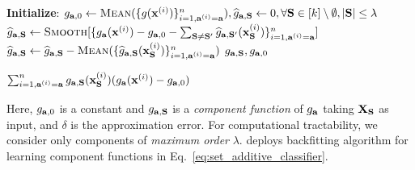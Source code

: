 \begin{algorithm}
\begin{algorithmic}[1]
		\label{algo_line:local_regression_start}
		\State \textbf{Initialize}: $ g_{\mathbf{a}, 0} \leftarrow \textsc{Mean}(\{g(\mathbf{x}^{(i)})\}_{i=1, \mathbf{a}^{(i)} = \mathbf{a}}^n), \widehat{g}_{\mathbf{a}, \mathbf{S}} \leftarrow 0, \forall \mathbf{S} \in [k]\setminus\emptyset, |\mathbf{S}|\le \lambda$ \label{alg_line:initialization}
		\State $ \widehat{g}_{\mathbf{a}, \mathbf{S}} \leftarrow \textsc{Smooth}[\{g_{\mathbf{a}}(\mathbf{x}^{(i)}) - g_{\mathbf{a}, 0} - \sum_{\mathbf{S} \ne \mathbf{S}'} \widehat{g}_{\mathbf{a}, \mathbf{S}'}(\mathbf{x}_{\mathbf{S}}^{(i)})\}_{i=1, \mathbf{a}^{(i)} = \mathbf{a}}^n] 
		$\label{alg_line:backfitting_step} 
		\State $\widehat{g}_{\mathbf{a}, \mathbf{S}}  \leftarrow \widehat{g}_{\mathbf{a}, \mathbf{S}} - \textsc{Mean}(\{\widehat{g}_{\mathbf{a}, \mathbf{S}}(\mathbf{x}_{\mathbf{S}}^{(i)})\}_{i=1, \mathbf{a}^{(i)} = \mathbf{a}}^n)$ \label{alg_line:mean_centered} 
		\EndFor
		\EndWhile
		\State \Return $ g_{\mathbf{a}, \mathbf{S}},g_{\mathbf{a}, 0} $
		\label{algo_line:local_regression_end} 
		\EndFunction
		
		
		\label{algo_line:covariance_computation_start}
		\State \Return $ \sum_{i=1, \mathbf{a}^{(i)} = \mathbf{a}}^n g_{\mathbf{a}, \mathbf{S}}(\mathbf{x}_{\mathbf{S}}^{(i)})(g_\mathbf{a}(\mathbf{x}^{(i)}) - g_{\mathbf{a}, 0}) $
		\label{algo_line:covariance_computation_end}
		\EndFunction
	\end{algorithmic}
\end{algorithm}
Here, $ g_{\mathbf{a}, 0} $ is a constant and $ g_{\mathbf{a},\mathbf{S}} $ is a \emph{component function} of $ g_{\mathbf{a}} $ taking  $ \mathbf{X}_{\mathbf{S}} $ as input, and $ \delta $ is the approximation error. For computational tractability, we consider only components of \emph{maximum order} $ \lambda $. {\fairXplainer} deploys backfitting algorithm for learning component functions in Eq.~\eqref{eq:set_additive_classifier}. 


